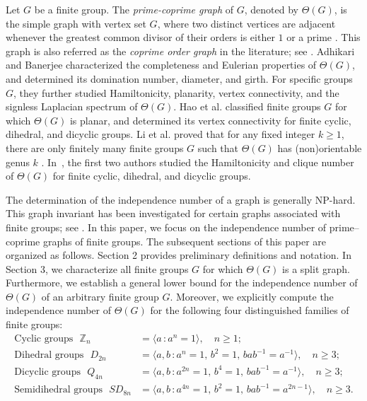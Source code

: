 \documentclass{amsart}
\theoremstyle{plain}
\theoremstyle{definition}
\DeclareMathOperator{\Z}{\mathbb{Z}}
\begin{document}
\vspace{0.4mm}
Let $G$ be a finite group. The \emph{prime-coprime graph} of $G$, denoted by $\Theta(G)$, is the simple graph with vertex set $G$, where two distinct vertices are adjacent whenever the greatest common divisor of their orders is either $1$ or a prime \cite{adhikari-nsjom22}. This graph is also referred as the \emph{coprime order graph} in the literature; see \cite{hao-2022, li-2022}. Adhikari and Banerjee \cite{adhikari-nsjom22} characterized the completeness and Eulerian properties of $\Theta(G)$, and determined its domination number, diameter, and girth. For specific groups $G$, they further studied Hamiltonicity, planarity, vertex connectivity, and the signless Laplacian spectrum of $\Theta(G)$. Hao et al. \cite{hao-2022} classified finite groups $G$ for which $\Theta(G)$ is planar, and determined its vertex connectivity for finite cyclic, dihedral, and dicyclic groups. Li et al. proved that for any fixed integer $k\geq 1$, there are only finitely many finite groups $G$ such that $\Theta(G)$ has (non)orientable genus $k$ \cite{li-2022}. In~\cite{shubh-arxiv25}, the first two authors studied the Hamiltonicity and clique number of $\Theta(G)$ for finite cyclic, dihedral, and dicyclic groups.


\vspace{0.4mm}


The determination of the independence number of a graph is generally NP-hard. This graph invariant has been investigated for certain graphs associated with finite groups; see \cite{camron-gc20, hamm-ijgt21, jitender-bmmss21, ma-im18, jitender-ca21}. In this paper, we focus on the independence number of prime–coprime graphs of finite groups. The subsequent sections of this paper are organized as follows. Section 2 provides preliminary definitions and notation. In Section 3, we characterize all finite groups $G$ for which $\Theta(G)$ is a split graph. Furthermore, we establish a general lower bound for the independence number of $\Theta(G)$ of an arbitrary finite group $G$. Moreover, we explicitly compute the independence number of $\Theta(G)$ for the following four distinguished families of finite groups:
\begin{align*}
\text{Cyclic groups }\,\, \Z_n &= \langle a \, \colon  a^n = 1\rangle, \quad n\geq 1;\\
\text{Dihedral groups }\,\, D_{2n} &= \langle a, b \, \colon  a^n = 1,\,  b^2 = 1,\, bab^{-1} = a^{-1}\rangle, \quad n\geq 3;\\
\text{Dicyclic groups }\,\,Q_{4n} &= \langle a, b \, \colon  a^{2n} = 1,\,  b^4 = 1,\, bab^{-1} = a^{-1}\rangle, \quad n\geq 3;\\
\text{Semidihedral groups }\,\, SD_{8n} &= \langle a, b \, \colon  a^{4n} = 1,\,  b^2 = 1,\, bab^{-1} = a^{2n-1}\rangle, \quad n\geq 3.
\end{align*}
\end{document}
